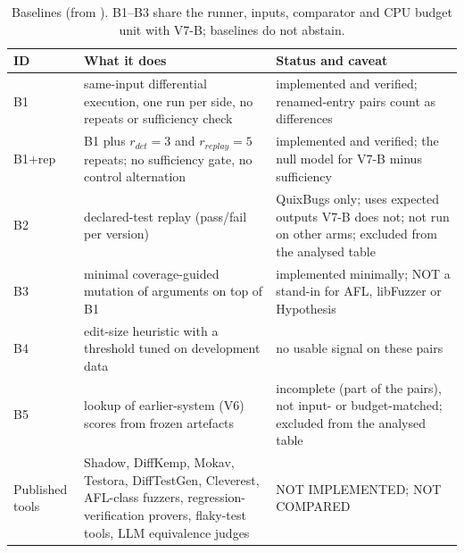 \begin{table}[t]
\centering\scriptsize
\caption{Baselines (from ). B1--B3 share the runner, inputs, comparator and CPU budget unit with V7-B; baselines do not abstain.}
\label{tab:baselines}
\begin{tabular}{p{}p{}p{}}
\hline
ID & What it does & Status and caveat \\
\hline
B1 & same-input differential execution, one run per side, no repeats or sufficiency check & implemented and verified; renamed-entry pairs count as differences \\
B1+rep & B1 plus $r_{det}=3$ and $r_{replay}=5$ repeats; no sufficiency gate, no control alternation & implemented and verified; the null model for V7-B minus sufficiency \\
B2 & declared-test replay (pass/fail per version) & QuixBugs only; uses expected outputs V7-B does not; not run on other arms; excluded from the analysed table \\
B3 & minimal coverage-guided mutation of arguments on top of B1 & implemented minimally; NOT a stand-in for AFL, libFuzzer or Hypothesis \\
B4 & edit-size heuristic with a threshold tuned on development data & no usable signal on these pairs \\
B5 & lookup of earlier-system (V6) scores from frozen artefacts & incomplete (part of the pairs), not input- or budget-matched; excluded from the analysed table \\
Published tools & Shadow, DiffKemp, Mokav, Testora, DiffTestGen, Cleverest, AFL-class fuzzers, regression-verification provers, flaky-test tools, LLM equivalence judges & NOT IMPLEMENTED; NOT COMPARED \\
\hline
\end{tabular}
\end{table}
